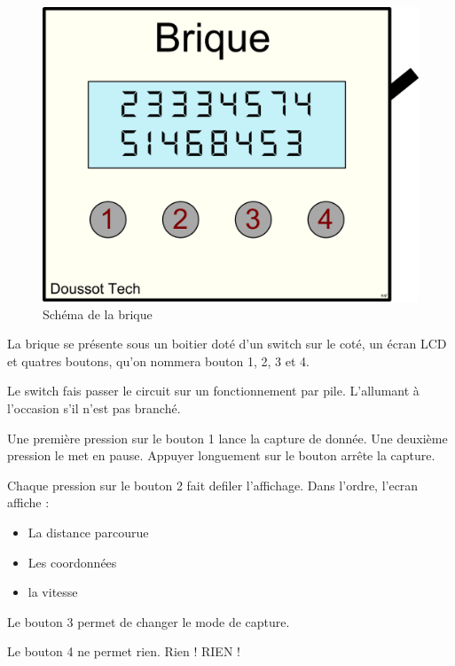 \documentclass[a4paper,12pt,titlepage]{article}
\begin{document}
\begin{figure}[H]
	\centering
	\includegraphics[width=\textwidth]{brique_dessin.png}
	\caption{Schéma de la brique}
	\label{brique_dessin}
\end{figure}

La brique se présente sous un boitier doté d'un switch sur le coté, un écran LCD et quatres boutons, qu'on nommera bouton 1, 2, 3 et 4.

\bigskip
Le switch fais passer le circuit sur un fonctionnement par pile. L'allumant à l'occasion s'il n'est pas branché.

Une première pression sur le bouton 1 lance la capture de donnée. Une deuxième pression le met en pause. Appuyer longuement sur le bouton arrête la capture.

Chaque pression sur le bouton 2 fait defiler l'affichage. Dans l'ordre, l'ecran affiche : 
\begin{itemize}
\item La distance parcourue
\item Les coordonnées
\item la vitesse
\end{itemize}

Le bouton 3 permet de changer le mode de capture.

Le bouton 4 ne permet rien. Rien ! RIEN !
\end{document}
